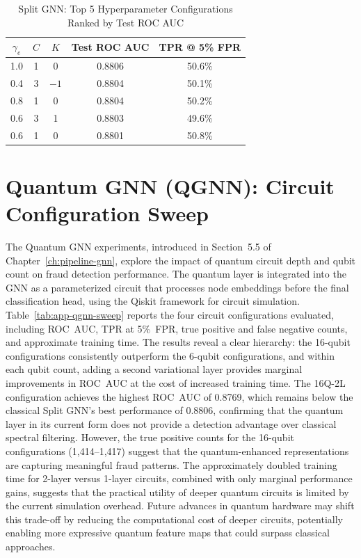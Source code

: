 \begin{table}[H]
\centering
\caption{Split GNN: Top 5 Hyperparameter Configurations Ranked by Test ROC AUC}
\label{tab:app-split-top5}
\small
\begin{tabular}{ccccc}
\toprule
$\gamma_e$ & $C$ & $K$ & Test ROC AUC & TPR @ 5\% FPR \\
\midrule
1.0 & 1 & 0  & 0.8806 & 50.6\% \\
0.4 & 3 & $-1$ & 0.8804 & 50.1\% \\
0.8 & 1 & 0  & 0.8804 & 50.2\% \\
0.6 & 3 & 1  & 0.8803 & 49.6\% \\
0.6 & 1 & 0  & 0.8801 & 50.8\% \\
\bottomrule
\end{tabular}
\end{table}

\section{Quantum GNN (QGNN): Circuit Configuration Sweep}
\label{app:qgnn-sweep}

The Quantum GNN experiments, introduced in Section~5.5 of Chapter~\ref{ch:pipeline-gnn}, explore the impact of quantum circuit depth and qubit count on fraud detection performance. The quantum layer is integrated into the GNN as a parameterized circuit that processes node embeddings before the final classification head, using the Qiskit framework for circuit simulation. Table~\ref{tab:app-qgnn-sweep} reports the four circuit configurations evaluated, including ROC~AUC, TPR at 5\%~FPR, true positive and false negative counts, and approximate training time. The results reveal a clear hierarchy: the 16-qubit configurations consistently outperform the 6-qubit configurations, and within each qubit count, adding a second variational layer provides marginal improvements in ROC~AUC at the cost of increased training time. The 16Q-2L configuration achieves the highest ROC~AUC of 0.8769, which remains below the classical Split GNN's best performance of 0.8806, confirming that the quantum layer in its current form does not provide a detection advantage over classical spectral filtering. However, the true positive counts for the 16-qubit configurations (1,414--1,417) suggest that the quantum-enhanced representations are capturing meaningful fraud patterns. The approximately doubled training time for 2-layer versus 1-layer circuits, combined with only marginal performance gains, suggests that the practical utility of deeper quantum circuits is limited by the current simulation overhead. Future advances in quantum hardware may shift this trade-off by reducing the computational cost of deeper circuits, potentially enabling more expressive quantum feature maps that could surpass classical approaches.

